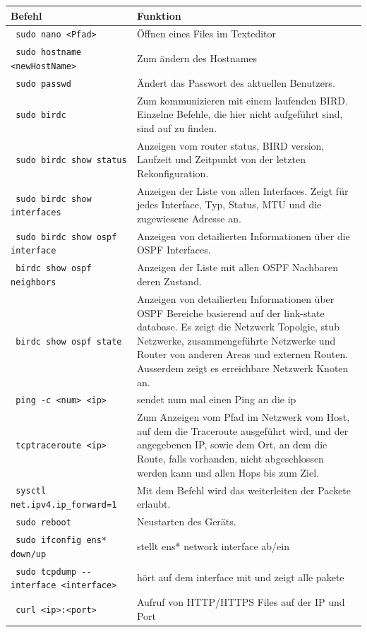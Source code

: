 \documentclass[11pt,titlepage]{article}
\begin{document}
\begin{tabular}{ |p{4cm}|p{10cm}|}
  \hline
  \textbf{Befehl} & \textbf{Funktion} \\
  \hline
  \lstinline! sudo nano <Pfad> ! & Öffnen eines Files im Texteditor \\
  \hline
  \lstinline! sudo hostname <newHostName>! & Zum ändern des Hostnames \\
  \hline
  \lstinline! sudo passwd! & Ändert das Passwort des aktuellen Benutzers. \\
  \hline
  \lstinline! sudo birdc ! & Zum kommunizieren mit einem laufenden BIRD. Einzelne Befehle, die hier nicht aufgeführt sind, sind auf \cite{BIRD_COMMAND} zu finden. \\
  \hline
  \lstinline! sudo birdc show status ! & Anzeigen vom router status, BIRD version, Laufzeit und Zeitpunkt von der letzten Rekonfiguration. \\
  \hline
  \lstinline! sudo birdc show interfaces ! & Anzeigen der Liste von allen Interfaces. Zeigt für jedes Interface, Typ, Status, MTU und die zugewiesene Adresse an.\\
  \hline
  \lstinline! sudo birdc show ospf interface ! & Anzeigen von detailierten Informationen über die OSPF Interfaces. \\
  \hline
  \lstinline! birdc show ospf neighbors ! & Anzeigen der Liste mit allen OSPF Nachbaren deren Zustand. \\
  \hline
  \lstinline! birdc show ospf state ! & Anzeigen von detailierten Informationen über OSPF Bereiche basierend auf der link-state database. Es zeigt die Netzwerk Topolgie, stub Netzwerke, zusammengeführte Netzwerke und Router von anderen Areas und externen Routen. Ausserdem zeigt es erreichbare Netzwerk Knoten an. \\
  \hline
  \lstinline! ping -c <num> <ip> ! & sendet num mal einen Ping an  die ip \\
  \hline
  \lstinline! tcptraceroute <ip> ! & Zum Anzeigen vom Pfad im Netzwerk vom Host, auf dem die Traceroute ausgeführt wird, und der angegebenen IP, sowie dem Ort, an dem die Route, falls vorhanden, nicht abgeschlossen werden kann und allen Hops bis zum Ziel. \\
  \hline
  \lstinline! sysctl net.ipv4.ip_forward=1 ! & Mit dem Befehl wird das weiterleiten der Packete erlaubt. \\
  \hline
  \lstinline! sudo reboot ! & Neustarten des Geräts. \\ 
  \hline
  \lstinline! sudo ifconfig ens* down/up ! & stellt ens* network interface ab/ein\\
  \hline
  \lstinline! sudo tcpdump --interface <interface> ! & hört auf dem interface mit und zeigt alle pakete\\
  \hline
  \lstinline! curl <ip>:<port> ! & Aufruf von HTTP/HTTPS Files auf der IP und Port\\
\hline
\end{tabular}
\end{document}
